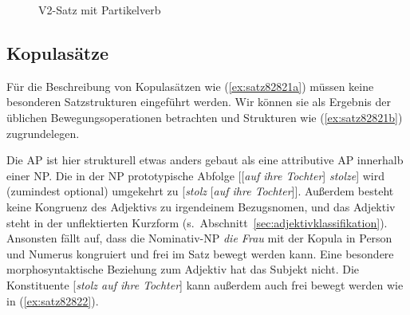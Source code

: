 \begin{figure}
  \centering
  \vspace{0.3cm}
  \caption{V2-Satz mit Partikelverb}
  \label{fig:v2mitpartikel}
\end{figure}

\subsection{Kopulasätze}

\label{sec:kopulakonstruktionen}


Für die Beschreibung von Kopulasätzen wie (\ref{ex:satz82821a}) müssen keine besonderen Satzstrukturen eingeführt werden.
Wir können sie als Ergebnis der üblichen Bewegungsoperationen betrachten und Strukturen wie (\ref{ex:satz82821b}) zugrundelegen.

\begin{exe}
  \ex\label{ex:satz82821} 
  \begin{xlist}
  \end{xlist}
\end{exe}

Die AP ist hier strukturell etwas anders gebaut als eine attributive AP innerhalb einer NP.
Die in der NP prototypische Abfolge [[\textit{auf ihre Tochter}] \textit{stolze}] wird (zumindest optional) umgekehrt zu [\textit{stolz} [\textit{auf ihre Tochter}]].
Außerdem besteht keine Kongruenz des Adjektivs zu irgendeinem Bezugsnomen, und das Adjektiv steht in der unflektierten Kurzform (s.\ Abschnitt~\ref{sec:adjektivklassifikation}).
Ansonsten fällt auf, dass die Nominativ-NP \textit{die Frau} mit der Kopula in Person und Numerus kongruiert und frei im Satz bewegt werden kann.
Eine besondere morphosyntaktische Beziehung zum Adjektiv hat das Subjekt nicht.
Die Konstituente [\textit{stolz auf ihre Tochter}] kann außerdem auch frei bewegt werden wie in (\ref{ex:satz82822}).

